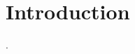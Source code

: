 \documentclass[../documentation.tex]{subfiles}
\begin{document}
\section{Introduction} \label{sec:introduction}
.
\end{document}
